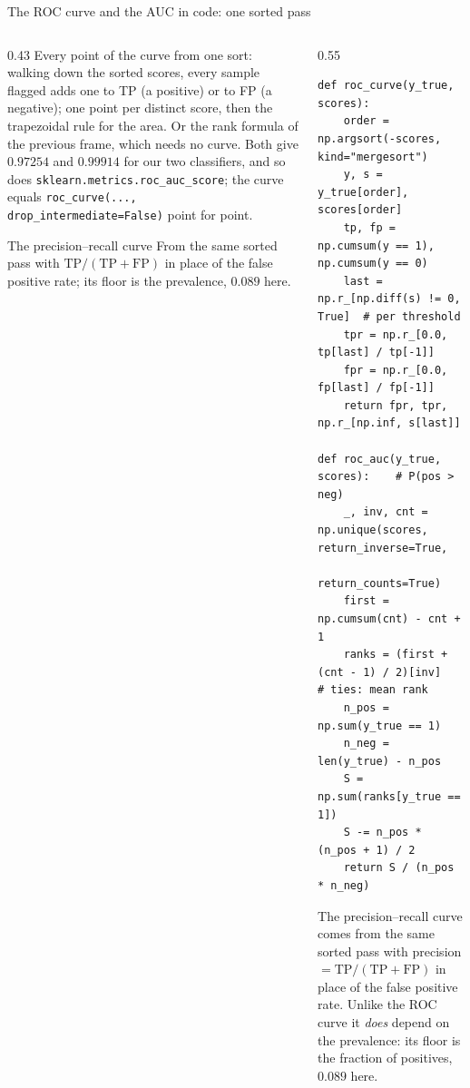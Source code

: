 \documentclass[10pt,aspectratio=169]{beamer}
\begin{document}
\begin{frame}[fragile]{The ROC curve and the AUC in code: one sorted pass}
\begin{columns}[T]
\begin{column}{0.43\textwidth}
\scriptsize
Every point of the curve from one sort: walking down the sorted scores,
every sample flagged adds one to TP (a positive) or to FP (a negative);
one point per distinct score, then the trapezoidal rule for the area.  Or
the rank formula of the previous frame, which needs no curve.  Both give
$0.97254$ and $0.99914$ for our two classifiers, and so does
\texttt{sklearn.metrics.roc\_auc\_score}; the curve equals
\texttt{roc\_curve(..., drop\_intermediate=False)} point for point.
\begin{block}{The precision--recall curve}
From the same sorted pass with $\mathrm{TP}/(\mathrm{TP}+\mathrm{FP})$ in
place of the false positive rate; its floor is the prevalence, $0.089$
here.
\end{block}
\end{column}
\begin{column}{0.55\textwidth}
\begin{lstlisting}
def roc_curve(y_true, scores):
    order = np.argsort(-scores, kind="mergesort")
    y, s = y_true[order], scores[order]
    tp, fp = np.cumsum(y == 1), np.cumsum(y == 0)
    last = np.r_[np.diff(s) != 0, True]  # per threshold
    tpr = np.r_[0.0, tp[last] / tp[-1]]
    fpr = np.r_[0.0, fp[last] / fp[-1]]
    return fpr, tpr, np.r_[np.inf, s[last]]

def roc_auc(y_true, scores):    # P(pos > neg)
    _, inv, cnt = np.unique(scores, return_inverse=True,
                            return_counts=True)
    first = np.cumsum(cnt) - cnt + 1
    ranks = (first + (cnt - 1) / 2)[inv]   # ties: mean rank
    n_pos = np.sum(y_true == 1)
    n_neg = len(y_true) - n_pos
    S = np.sum(ranks[y_true == 1])
    S -= n_pos * (n_pos + 1) / 2
    return S / (n_pos * n_neg)
\end{lstlisting}
\scriptsize
The precision--recall curve comes from the same sorted pass with
precision $=\mathrm{TP}/(\mathrm{TP}+\mathrm{FP})$ in place of the false
positive rate.  Unlike the ROC curve it \emph{does} depend on the
prevalence: its floor is the fraction of positives, $0.089$ here.
\end{column}
\end{columns}
\end{frame}
\end{document}
